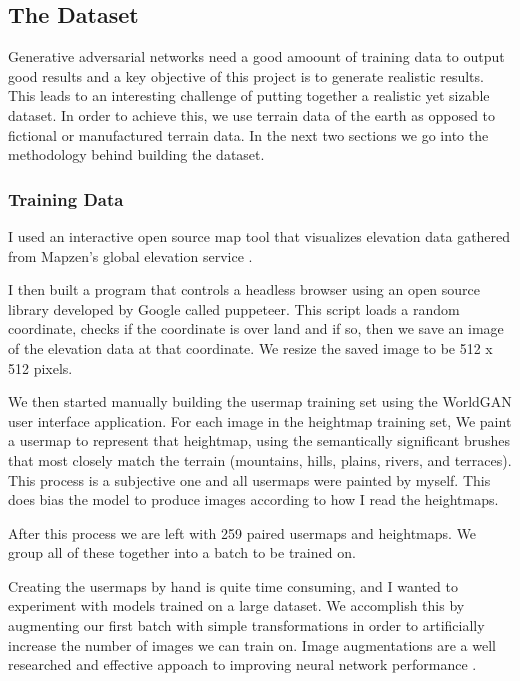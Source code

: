 \documentclass[twocolumn]{article}
\begin{document}
	\subsection{The Dataset}
	
	Generative adversarial networks need a good amoount of training data to output good results and a key objective of this project is to generate realistic results. This leads to an interesting challenge of putting together a realistic yet sizable dataset. In order to achieve this, we use terrain data of the earth as opposed to fictional or manufactured terrain data. In the next two sections we go into the methodology behind building the dataset.

	\subsubsection{Training Data}
	
	I used an interactive open source map tool that visualizes elevation data gathered from Mapzen's global elevation service \cite{richardson2016mapzen}.
	
	I then built a program that controls a headless browser using an open source library developed by Google called puppeteer. This script loads a random coordinate, checks if the coordinate is over land and if so, then we save an image of the elevation data at that coordinate. We resize the saved image to be 512 x 512 pixels.
	
	We then started manually building the usermap training set using the WorldGAN user interface application. For each image in the heightmap training set, We paint a usermap to represent that heightmap, using the semantically significant brushes that most closely match the terrain (mountains, hills, plains, rivers, and terraces). This process is a subjective one and all usermaps were painted by myself. This does bias the model to produce images according to how I read the heightmaps.

	After this process we are left with 259 paired usermaps and heightmaps. We group all of these together into a batch to be trained on.

	Creating the usermaps by hand is quite time consuming, and I wanted to experiment with models trained on a large dataset. We accomplish this by augmenting our first batch with simple transformations in order to artificially increase the number of images we can train on. Image augmentations are a well researched and effective appoach to improving neural network performance \cite{perez2017effectiveness}.
	
\end{document}
